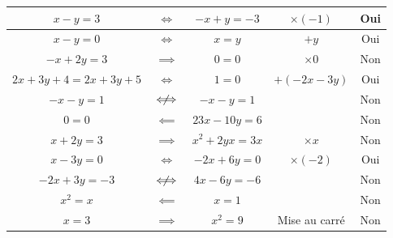 {\begin{center}
\begin{tabular}{ccc|c|c}
		$x-y= 3$ & {$\iff$} & $-x + y = -3$ & {$\times(-1)$} & {Oui} \\ \hline
		$x -y = 0$ &{$\iff$} & $x=y$ & {$+y$} & {Oui} \\ \hline
		$-x + 2y = 3$ & {$\implies$} & $0=0$ & {$\times0$} & {Non} \\ \hline
		$2x + 3y + 4 = 2x + 3y + 5$ & {$\iff$} & $1=0$ & {$+(-2x-3y)$} & {Oui} \\ \hline
		$-x - y = 1$ & {$\centernot\iff$} & $-x - y = 1$ & & {Non} \\ \hline
		$0=0$ & {$\impliedby$} & $23x - 10y = 6$ & & {Non} \\ \hline
		$x + 2y = 3$ & {$\implies$} & $x^2 + 2yx = 3x$ & {$\times x$} & {Non} \\ \hline
		$x-3y  =0$ & {$\iff$} & $-2x+6y = 0$ & {$\times(-2)$} & {Oui} \\ \hline
		$-2x + 3y = -3$ & {$\centernot\iff$} & $4x - 6y = -6$ & & {Non} \\ \hline
		$x^2 = x$ & {$\impliedby$} & $x = 1$ & & {Non} \\ \hline
		$x = 3$ & {$\implies$} & $x^2 = 9$ & {Mise au carré} & {Non} \\ \hline
	\end{tabular}
	\end{center}
	
}

